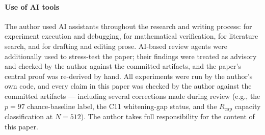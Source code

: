 \documentclass[11pt]{article}
\begin{document}
\paragraph{Use of AI tools}
The author used AI assistants throughout the research and writing process: for experiment execution and debugging, for mathematical verification, for literature search, and for drafting and editing prose. AI-based review agents were additionally used to stress-test the paper; their findings were treated as advisory and checked by the author against the committed artifacts, and the paper's central proof was re-derived by hand. All experiments were run by the author's own code, and every claim in this paper was checked by the author against the committed artifacts --- including several corrections made during review (e.g., the $p{=}97$ chance-baseline label, the C11 whitening-gap status, and the $R_{\mathrm{cap}}$ capacity classification at $N{=}512$). The author takes full responsibility for the content of this paper.
\end{document}
